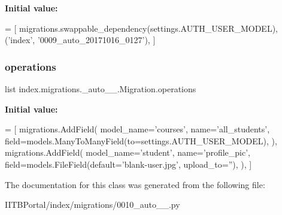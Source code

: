 {\bfseries Initial value\+:}
\begin{DoxyCode}
=  [
        migrations.swappable\_dependency(settings.AUTH\_USER\_MODEL),
        (\textcolor{stringliteral}{'index'}, \textcolor{stringliteral}{'0009\_auto\_20171016\_0127'}),
    ]
\end{DoxyCode}
\mbox{\label{classindex_1_1migrations_1_10010__auto__20171024__1223_1_1Migration_aab02cfa5126f00c93c3d65bc7f1e5d00}} 
\subsubsection{\texorpdfstring{operations}{operations}}
{\footnotesize\ttfamily list index.\+migrations.\+\_\+auto\+\_\+\_.\+Migration.\+operations\hspace{0.3cm}{\ttfamily [static]}}

{\bfseries Initial value\+:}
\begin{DoxyCode}
=  [
        migrations.AddField(
            model\_name=\textcolor{stringliteral}{'courses'},
            name=\textcolor{stringliteral}{'all\_students'},
            field=models.ManyToManyField(to=settings.AUTH\_USER\_MODEL),
        ),
        migrations.AddField(
            model\_name=\textcolor{stringliteral}{'student'},
            name=\textcolor{stringliteral}{'profile\_pic'},
            field=models.FileField(default=\textcolor{stringliteral}{'blank-user.jpg'}, upload\_to=\textcolor{stringliteral}{''}),
        ),
    ]
\end{DoxyCode}


The documentation for this class was generated from the following file\+:\begin{DoxyCompactItemize}
\item 
I\+I\+T\+B\+Portal/index/migrations/0010\+\_\+auto\+\_\+\_.\+py\end{DoxyCompactItemize}
